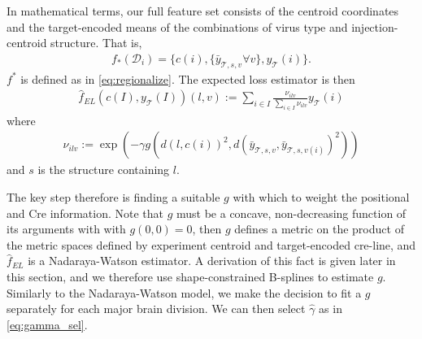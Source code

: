 In mathematical terms, our full feature set consists of the centroid coordinates and the target-encoded means of the combinations of virus type and injection-centroid structure.
That is, 
\begin{eqnarray*}
f_*({\mathcal D}_i) = \{c(i) , \{\bar y_{\mathcal T,s,v}  \forall v \}, y_{\mathcal T}(i) \}.
\end{eqnarray*}
$f^*$ is defined as in \eqref{eq:regionalize}.
The expected loss estimator is then 
\begin{eqnarray*}
\hat f_{EL} ( c(I),y_{\mathcal T} (I))(l,v) :=  \sum_{i \in I} \frac{ \nu_{ilv} }{\sum_{i \in I}  \nu_{ilv}  } y_{\mathcal T}(i)
\end{eqnarray*}
where
\begin{eqnarray*}
\nu_{ilv} := \exp (- \gamma g( d(l, c(i))^2, d(\bar y_{\mathcal T,s,v} , \bar y_{\mathcal T,s,v(i)}  )^2))
\end{eqnarray*}
and $s$ is the structure containing $l$.

The key step therefore is finding a suitable $g$ with which to weight the positional and Cre information.
Note that $g$ must be a concave, non-decreasing function of its arguments with with $g(0,0) = 0$, then $g$ defines a metric on the product of the metric spaces defined by experiment centroid and target-encoded cre-line, and $\hat f_{EL}$ is a Nadaraya-Watson estimator. 
A derivation of this fact is given later in this section, and we therefore use shape-constrained B-splines to estimate $g$.
Similarly to the Nadaraya-Watson model, we make the decision to fit a $g$ separately for each major brain division.
We can then select $\hat \gamma$ as in \ref{eq:gamma_sel}.

\newpage

